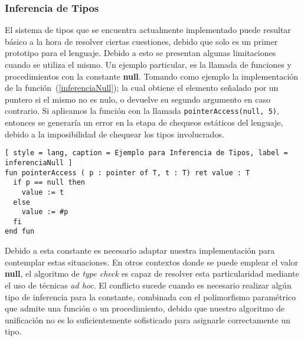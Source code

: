 \subsubsection{Inferencia de Tipos}

El sistema de tipos que se encuentra actualmente implementado puede resultar básico a la hora de resolver ciertas cuestiones, debido que solo es un primer prototipo para el lenguaje.
Debido a esto se presentan algunas limitaciones cuando se utiliza el mismo.
Un ejemplo particular, es la llamada de funciones y procedimientos con la constante \textbf{null}.
Tomando como ejemplo la implementación de la función~(\ref{inferenciaNull}); la cual obtiene el elemento señalado por un puntero si el mismo no es nulo, o devuelve su segundo argumento en caso contrario.
Si aplicamos la función con la llamada \lstinline[style = lang]{pointerAccess(null, 5)}, entonces se generaría un error en la etapa de chequeos estáticos del lenguaje, debido a la imposibilidad de chequear los tipos involucrados.

\iffalse
Esto es debido que la constante \textbf{null} tiene tipo polimórfico, lo que significa que puede ser utilizada como un puntero a un entero, como también un puntero a un arreglo, o alguna otra estructura diferente.
Esta característica permite un sistema de tipos más flexible, lo que facilita el uso del intérprete; pero al mismo tiempo, imposibilita el chequeo de tipos cuando el \textit{algoritmo de unificación} necesita de información adicional para inferir un tipo particular en la llamada de una función o procedimiento.
\fi

\begin{lstlisting}[ style = lang, caption = Ejemplo para Inferencia de Tipos, label = inferenciaNull ]
fun pointerAccess ( p : pointer of T, t : T) ret value : T
  if p == null then
    value := t
  else
    value := #p
  fi
end fun
\end{lstlisting}

Debido a esta constante es necesario adaptar nuestra implementación para contemplar estas situaciones.
En otros contextos donde se puede emplear el valor \textbf{null}, el algoritmo de \textit{type check} es capaz de resolver esta particularidad mediante el uso de técnicas \textit{ad hoc}.
El conflicto sucede cuando es necesario realizar algún tipo de inferencia para la constante, combinada con el polimorfismo paramétrico que admite una función o un procedimiento, debido que nuestro algoritmo de unificación no es lo suficientemente sofisticado para asignarle correctamente un tipo.

